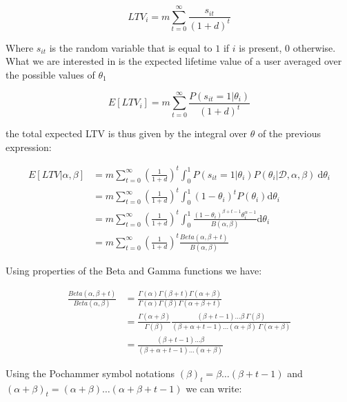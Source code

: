 \documentclass{tufte-book}
\begin{document}
\begin{equation}
  LTV_i = m \sum_{t=0}^\infty \frac{s_{it}}{\left(1+d\right)^t}
\end{equation}

Where $s_{it}$ is the random variable that is equal to $1$ if $i$ is present, $0$ otherwise. What we are interested in is the expected lifetime value of a user averaged over the possible values of
$\theta_1$

\begin{equation}
  E\left[LTV_i\right] = m \sum_{t=0}^\infty \frac{P(s_{it}=1|\theta_i)}{(1+d)^t}
\end{equation}

the total expected LTV is thus given by the integral over $\theta$ of the previous expression:

\begin{align*}
  E\left[LTV|\alpha, \beta\right] &= m \sum_{t=0}^\infty \left(\frac{1}{1+d}\right)^t \int_0^1 P(s_{it}=1 | \theta_i)
  P(\theta_i|\mathcal{D}, \alpha, \beta)
  \: \mathrm{d} \theta_i\\
  & = m \sum_{t=0}^\infty \left(\frac{1}{1+d}\right)^t \int_0^1 \left(1-\theta_i\right)^t P(\theta_i)
  \mathrm{d}\theta_i\\
  & = m \sum_{t=0}^\infty \left(\frac{1}{1+d}\right)^t \int_0^1 \frac{\left(1-\theta_i\right)^{\beta+t-1}
  \theta_i^{\alpha-1} }{B(\alpha, \beta)}\mathrm{d}\theta_i\\
  & = m \sum_{t=0}^\infty \left(\frac{1}{1+d}\right)^t \frac{Beta(\alpha, \beta+t) }{B(\alpha, \beta)}
\end{align*}

Using properties of the Beta and Gamma functions we have:

\begin{align*}
  \frac{Beta(\alpha, \beta+t)}{Beta(\alpha, \beta)} &=
  \frac{\Gamma(\alpha)\Gamma(\beta+t)\Gamma(\alpha+\beta)}{\Gamma(\alpha)\Gamma(\beta)\Gamma(\alpha+\beta+t)}\\
  &= \frac{\Gamma(\alpha+\beta)}{\Gamma(\beta)}
  \frac{(\beta+t-1)\dots\beta\:\Gamma(\beta)}{(\beta+\alpha+t-1)\dots(\alpha+\beta)\:\Gamma(\alpha+\beta)}\\
  &= \frac{(\beta+t-1)\dots\beta}{(\beta+\alpha+t-1)\dots(\alpha+\beta)}
\end{align*}

Using the Pochammer symbol notations $(\beta)_t = \beta \dots (\beta+t-1)$ and $(\alpha+\beta)_t =
(\alpha+\beta) \dots (
\alpha+\beta+t-1)$ we can write:
\end{document}
